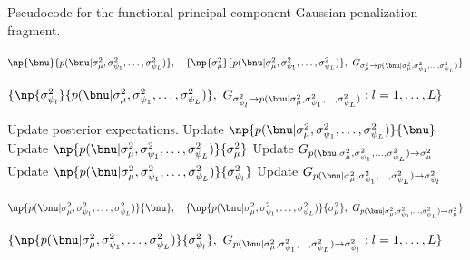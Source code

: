 \documentclass[ba]{imsart}
\numberwithin{equation}{section}
\theoremstyle{plain}
\def\sigsqmu{\sigma^2_{\mu}}
\newcommand\sigsqpsi[1]{\sigma^2_{\psi_{#1}}}
\begin{document}
\begin{algorithm}
	\caption{
		Pseudocode for the functional principal component Gaussian penalization fragment.
	}
	\label{alg:mean_fpc_gauss_pen_frag}
	\begin{algorithmic}[1]
		\Inputs
			\begin{varwidth}[t]{\linewidth} $
				\np{\bnu}{p (\bnu | \sigsqmu, \sigsqpsi{1}, \dots, \sigsqpsi{L})}, \quad
				\{
					\np{\sigsqmu}{p (\bnu | \sigsqmu, \sigsqpsi{1}, \dots, \sigsqpsi{L})}, \
					G_{\sigsqmu \rightarrow p (\bnu | \sigsqmu, \sigsqpsi{1}, \dots, \sigsqpsi{L})}
				\}
			$\par$
				\{
					\np{\sigsqpsi{l}}{p (\bnu | \sigsqmu, \sigsqpsi{1}, \dots, \sigsqpsi{L})}, \
					G_{\sigsqpsi{l} \rightarrow p (\bnu | \sigsqmu, \sigsqpsi{1}, \dots, \sigsqpsi{L})} :
					l = 1, \dots, L
				\}
			$ \end{varwidth}
		\Updates
			\State Update posterior expectations.
			\State Update $\np{p (\bnu | \sigsqmu, \sigsqpsi{1}, \dots, \sigsqpsi{L})}{\bnu}$
				\Comment{equation \eqref{np_pen_nu}}
			\State Update $\np{p (\bnu | \sigsqmu, \sigsqpsi{1}, \dots, \sigsqpsi{L})}{\sigsqmu}$
			\State Update $G_{p (\bnu | \sigsqmu, \sigsqpsi{1}, \dots, \sigsqpsi{L}) \rightarrow \sigsqmu}$
			\For{$l = 1, \dots, L$}
				\State Update $\np{p (\bnu | \sigsqmu, \sigsqpsi{1}, \dots, \sigsqpsi{L})}{\sigsqpsi{l}}$
				\State Update $G_{p (\bnu | \sigsqmu, \sigsqpsi{1}, \dots, \sigsqpsi{L}) \rightarrow \sigsqpsi{l}}$
			\EndFor
		\Outputs
			\begin{varwidth}[t]{\linewidth} $
				\np{p (\bnu | \sigsqmu, \sigsqpsi{1}, \dots, \sigsqpsi{L})}{\bnu}, \quad
				\{
					\np{p (\bnu | \sigsqmu, \sigsqpsi{1}, \dots, \sigsqpsi{L})}{\sigsqmu}, \
					G_{p (\bnu | \sigsqmu, \sigsqpsi{1}, \dots, \sigsqpsi{L}) \rightarrow \sigsqmu}
				\}
			$\par$
				\{
					\np{p (\bnu | \sigsqmu, \sigsqpsi{1}, \dots, \sigsqpsi{L})}{\sigsqpsi{l}}, \
					G_{p (\bnu | \sigsqmu, \sigsqpsi{1}, \dots, \sigsqpsi{L}) \rightarrow \sigsqpsi{l}} :
					l = 1, \dots, L
				\}
			$ \end{varwidth}
	\end{algorithmic}
\end{algorithm}

\end{document}
